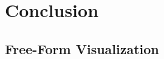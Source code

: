 \documentclass[10pt,a4paper]{article}
\begin{document}
\newpage
\section{Conclusion}
%
\subsection{Free-Form Visualization}
%
\end{document}
